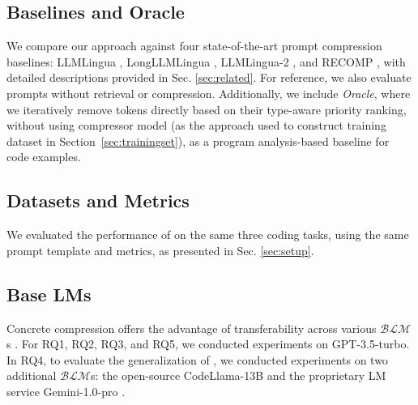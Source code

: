 

\subsection{Baselines and Oracle}
We compare our approach against four state-of-the-art prompt compression baselines: LLMLingua \citep{llmlingua}, LongLLMLingua \citep{longllmlingua}, LLMLingua-2 \citep{lingua2}, and RECOMP \citep{recomp}, with detailed descriptions provided in Sec. \ref{sec:related}. For reference, we also evaluate prompts without retrieval or compression. Additionally, we include \emph{Oracle}, where we iteratively remove tokens directly based on their type-aware priority ranking, without using compressor model (as the approach used to construct training dataset in Section~\ref{sec:trainingset}), as a program analysis-based baseline for code examples.

\subsection{Datasets and Metrics}
We evaluated the performance of \ourtool on the same three coding tasks, using the same prompt template and metrics, as presented in Sec. \ref{sec:setup}.%

\subsection{Base LMs}
Concrete compression offers the advantage of transferability across various $\mathcal{BLM}$s \cite{recomp,rl}. For RQ1, RQ2, RQ3, and RQ5, we conducted experiments on GPT-3.5-turbo. In RQ4, to evaluate the generalization of \ourtool, we conducted experiments on two additional $\mathcal{BLM}$s: the open-source CodeLlama-13B \citep{codeLlama} and the proprietary LM service Gemini-1.0-pro \citep{gemini}.



